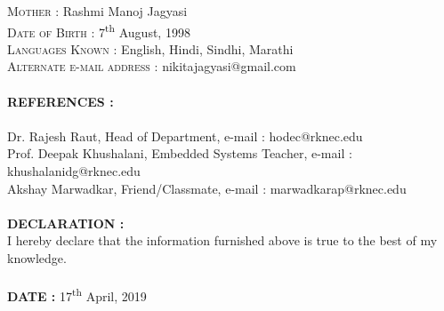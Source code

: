 \documentclass[12pt]{article}
\begin{document}
	\textsc{Mother : }Rashmi Manoj Jagyasi\\
	\textsc{Date of Birth : }7\textsuperscript{th} August, 1998\\
	\textsc{Languages Known : }English, Hindi, Sindhi, Marathi\\
	\textsc{Alternate e-mail address : }nikitajagyasi@gmail.com\\
	\\
	\textbf{\textsc{REFERENCES : }}\\
	\\
	Dr. Rajesh Raut, Head of Department, e-mail : hodec@rknec.edu\\
	Prof. Deepak Khushalani, Embedded Systems Teacher, e-mail : khushalanidg@rknec.edu\\
	Akshay Marwadkar, Friend/Classmate, e-mail : marwadkarap@rknec.edu\\
	\\
	\textbf{\textsc{DECLARATION : }}\\
	I hereby declare that the information furnished above is true to the best of my knowledge.\\
	\\
	\textbf{\textsc{DATE : }}17\textsuperscript{th} April, 2019
\end{document}
